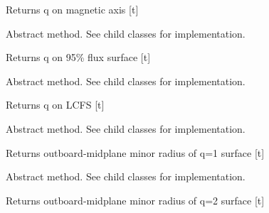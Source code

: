 \documentclass[letterpaper,10pt,english]{sphinxmanual}
\begin{document}
\begin{fulllineitems}
\begin{fulllineitems}
Returns q on magnetic axis {[}t{]}

\end{fulllineitems}


\begin{fulllineitems}
\label{\detokenize{eqtools:eqtools.core.Equilibrium.getQ95}}
Abstract method.  See child classes for implementation.

Returns q on 95\% flux surface {[}t{]}

\end{fulllineitems}


\begin{fulllineitems}
\label{\detokenize{eqtools:eqtools.core.Equilibrium.getQLCFS}}
Abstract method.  See child classes for implementation.

Returns q on LCFS {[}t{]}

\end{fulllineitems}


\begin{fulllineitems}
\label{\detokenize{eqtools:eqtools.core.Equilibrium.getQ1Surf}}
Abstract method.  See child classes for implementation.

Returns outboard-midplane minor radius of q=1 surface {[}t{]}

\end{fulllineitems}


\begin{fulllineitems}
\label{\detokenize{eqtools:eqtools.core.Equilibrium.getQ2Surf}}
Abstract method.  See child classes for implementation.

Returns outboard-midplane minor radius of q=2 surface {[}t{]}


\end{fulllineitems}
\end{fulllineitems}
\end{document}

